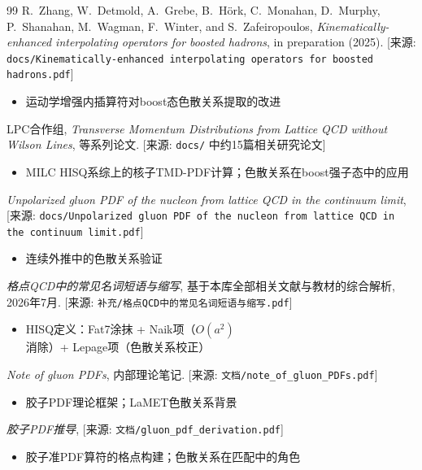 \documentclass[12pt,a4paper]{ctexart}
\theoremstyle{definition}
\begin{document}
\begin{thebibliography}{99}
R.~Zhang, W.~Detmold, A.~Grebe, B.~H\"ork, C.~Monahan, D.~Murphy, P.~Shanahan, M.~Wagman, F.~Winter, and S.~Zafeiropoulos,
\textit{Kinematically-enhanced interpolating operators for boosted hadrons},
in preparation (2025).
[来源: \texttt{docs/Kinematically-enhanced interpolating operators for boosted hadrons.pdf}]
\begin{itemize}
    \item 运动学增强内插算符对boost态色散关系提取的改进
\end{itemize}

LPC合作组,
\textit{Transverse Momentum Distributions from Lattice QCD without Wilson Lines},
等系列论文.
[来源: \texttt{docs/} 中约15篇相关研究论文]
\begin{itemize}
    \item MILC HISQ系综上的核子TMD-PDF计算；色散关系在boost强子态中的应用
\end{itemize}

\textit{Unpolarized gluon PDF of the nucleon from lattice QCD in the continuum limit},
[来源: \texttt{docs/Unpolarized gluon PDF of the nucleon from lattice QCD in the continuum limit.pdf}]
\begin{itemize}
    \item 连续外推中的色散关系验证
\end{itemize}

\textit{格点QCD中的常见名词短语与缩写},
基于本库全部相关文献与教材的综合解析, 2026年7月.
[来源: \texttt{补充/格点QCD中的常见名词短语与缩写.pdf}]
\begin{itemize}
    \item HISQ定义：Fat7涂抹 + Naik项（$O(a^2)$消除）+ Lepage项（色散关系校正）
\end{itemize}

\textit{Note of gluon PDFs},
内部理论笔记.
[来源: \texttt{文档/note\_of\_gluon\_PDFs.pdf}]
\begin{itemize}
    \item 胶子PDF理论框架；LaMET色散关系背景
\end{itemize}

\textit{胶子PDF推导},
[来源: \texttt{文档/gluon\_pdf\_derivation.pdf}]
\begin{itemize}
    \item 胶子准PDF算符的格点构建；色散关系在匹配中的角色
\end{itemize}

\end{thebibliography}
\end{document}

